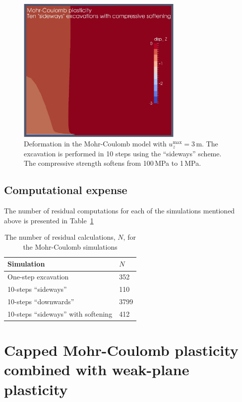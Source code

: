 \documentclass[]{scrreprt}
\begin{document}
\begin{figure}[htb]
\begin{center}
\includegraphics[width=8cm]{mc_only_10_sideways_soften_disp.pdf}
\caption{Deformation in the Mohr-Coulomb model with
  $u_{z}^{\mathrm{max}} = 3$\,m.  The excavation is performed in 10
  steps using the ``sideways'' scheme.  The compressive strength
  softens from 100\,MPa to 1\,MPa.}
\label{mc.10_sideways_soften_soften}
\end{center}
\end{figure}

\section{Computational expense}

The number of residual computations for each of the simulations
mentioned above is presented in Table~\ref{mc.n}

\begin{table}[htb]
\begin{center}
\begin{tabular}{ll}
Simulation & $N$ \\
\hline
One-step excavation & 352 \\
10-steps ``sideways'' & 110 \\
10-steps ``downwards'' & 3799 \\
10-steps ``sideways'' with softening & 412
\end{tabular}
\caption{The number of residual calculations, $N$, for the Mohr-Coulomb
  simulations}
\label{mc.n}
\end{center}
\end{table}

\chapter{Capped Mohr-Coulomb plasticity combined with weak-plane plasticity}
\end{document}
